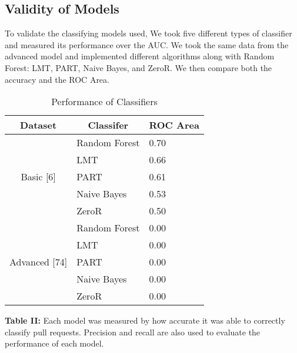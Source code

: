 \documentclass[10pt, conference]{IEEEtran}
\begin{document}
\subsection{Validity of Models}
To validate the classifying models used, We took five different types of classifier and measured its performance over the AUC. We took the same data from the advanced model and implemented different algorithms along with Random Forest: LMT, PART, Naive Bayes, and ZeroR. We then compare both the accuracy and the ROC Area.

\begin{table}[h!]
  \centering
  \caption{Performance of Classifiers}
  \label{tab:Figure II}
  \begin{tabular}{|c|c|c|}
    \hline
    \textbf {Dataset} & \textbf{Classifer} & \textbf{ROC Area}\\
    \hline
    \multirow{5}{*}{Basic [6]}
    				& \multicolumn{1}{l|}{Random Forest} & \multicolumn{1}{l|}{0.70} \\\cline{2-3}
                                 & \multicolumn{1}{l|}{LMT} & \multicolumn{1}{l|}{0.66} \\\cline{2-3}
                                 & \multicolumn{1}{l|}{PART} & \multicolumn{1}{l|}{0.61} \\\cline{2-3}
                                 & \multicolumn{1}{l|}{Naive Bayes} & \multicolumn{1}{l|}{0.53} \\\cline{2-3}
                                 & \multicolumn{1}{l|}{ZeroR} & \multicolumn{1}{l|}{0.50} \\\hline
    \multirow{5}{*}{Advanced [74]} 
    				& \multicolumn{1}{l|}{Random Forest} & \multicolumn{1}{l|}{0.00} \\\cline{2-3}
                                 & \multicolumn{1}{l|}{LMT} & \multicolumn{1}{l|}{0.00} \\\cline{2-3}
                                 & \multicolumn{1}{l|}{PART} & \multicolumn{1}{l|}{0.00} \\\cline{2-3}
                                 & \multicolumn{1}{l|}{Naive Bayes} & \multicolumn{1}{l|}{0.00} \\\cline{2-3}
                                 & \multicolumn{1}{l|}{ZeroR} & \multicolumn{1}{l|}{0.00} \\\hline
  \end{tabular}
  \break
  \break
\textbf{Table II:} Each model was measured by how accurate it was able to correctly classify pull requests. Precision and recall are also used to evaluate the performance of each model.
\end{table}
\end{document}
